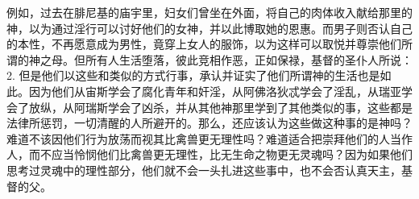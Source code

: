 \par

例如，过去在腓尼基的庙宇里，妇女们曾坐在外面，将自己的肉体收入献给那里的神，以为通过淫行可以讨好他们的女神，并以此博取她的恩惠。而男子则否认自己的本性，不再愿意成为男性，竟穿上女人的服饰，以为这样可以取悦并尊崇他们所谓的神之母。但所有人生活堕落，彼此竞相作恶，正如保禄，基督的圣仆人所说： 2. 但是他们以这些和类似的方式行事，承认并证实了他们所谓神的生活也是如此。因为他们从宙斯学会了腐化青年和奸淫，从阿佛洛狄忒学会了淫乱，从瑞亚学会了放纵，从阿瑞斯学会了凶杀，并从其他神那里学到了其他类似的事，这些都是法律所惩罚，一切清醒的人所避开的。那么，还应该认为这些做这种事的是神吗？难道不该因他们行为放荡而视其比禽兽更无理性吗？难道适合把崇拜他们的人当作人，而不应当怜悯他们比禽兽更无理性，比无生命之物更无灵魂吗？因为如果他们思考过灵魂中的理性部分，他们就不会一头扎进这些事中，也不会否认真天主，基督的父。\par

\par

